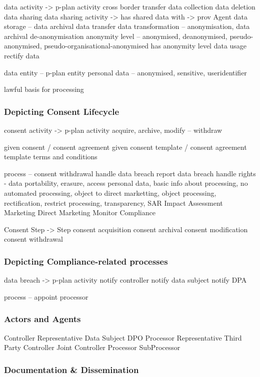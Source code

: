 data activity -> p-plan activity
cross border transfer
data collection
data deletion
data sharing
    data sharing activity -> has shared data with -> prov Agent
data storage -- data archival
data transfer
data transformation -- anonymisation, data archival de-anonymisation
    anonymity level -- anonymised, deanonymised, pseudo-anonymised, pseudo-organisational-anonymised
    has anonymity level
data usage
rectify data

data entity -- p-plan entity
personal data -- anonymised, sensitive, useridentifier

lawful basis for processing

\subsubsection{Depicting Consent Lifecycle}
consent activity -> p-plan activity
acquire, archive, modify -- withdraw

given consent / consent agreement
given consent template / consent agreement template
terms and conditions

process --
    consent withdrawal
    handle data breach
        report data breach
    handle rights - data portability, erasure, access personal data, basic info about processing, no automated processing, object to direct marketting, object processing, rectification, restrict processing, transparency, SAR
    Impact Assessment
    Marketing
        Direct Marketing
    Monitor Compliance

Consent Step -> Step
    consent acquisition
    consent archival
    consent modification
        consent withdrawal
    

\subsubsection{Depicting Compliance-related processes}
data breach -> p-plan activity
notify controller
notify data subject
notify DPA

process --
    appoint processor

\subsubsection{Actors and Agents}
Controller Representative
Data Subject
DPO
Processor Representative
Third Party
    Controller
        Joint Controller
    Processor
        SubProcessor

\subsubsection{Documentation \& Dissemination}


